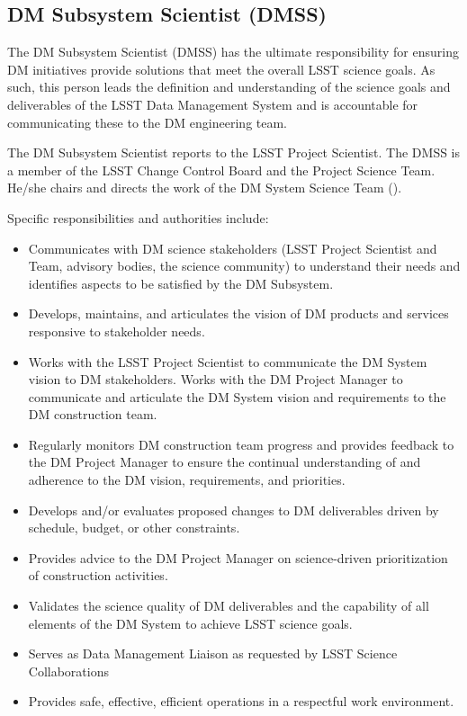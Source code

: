 \subsection{DM Subsystem Scientist (DMSS) \label{role:dmps} }

The DM Subsystem Scientist (DMSS) has the ultimate responsibility for ensuring DM initiatives provide solutions that meet the overall LSST science goals. As such, this person leads the definition and understanding of the science goals and deliverables of the LSST Data Management System and is accountable for communicating these to the DM engineering team.

The DM Subsystem Scientist reports to the LSST Project Scientist. The DMSS is a member of the LSST Change Control Board and the Project Science Team. He/she chairs and directs the work of the DM System Science Team ().

Specific responsibilities and authorities include:


\begin{itemize}
\item Communicates with DM science stakeholders (LSST Project Scientist and Team, advisory bodies, the science community) to understand their needs and identifies aspects to be satisfied by the DM Subsystem.
\item Develops, maintains, and articulates the vision of DM products and services responsive to stakeholder needs.
\item Works with the LSST Project Scientist to communicate the DM System vision to DM stakeholders. Works with the DM Project Manager to communicate and articulate the DM System vision and requirements to the DM construction team.
\item Regularly monitors DM construction team progress and provides feedback to the DM Project Manager to ensure the continual understanding of and adherence to the DM vision, requirements, and priorities.
\item Develops and/or evaluates proposed changes to DM deliverables driven by schedule, budget, or other constraints.
\item Provides advice to the DM Project Manager on science-driven prioritization of construction activities.
\item Validates the science quality of DM deliverables and the capability of all elements of the DM System to achieve LSST science goals.
\item Serves as Data Management Liaison as requested by LSST Science Collaborations
\item Provides safe, effective, efficient operations in a respectful work environment.
\end{itemize}

